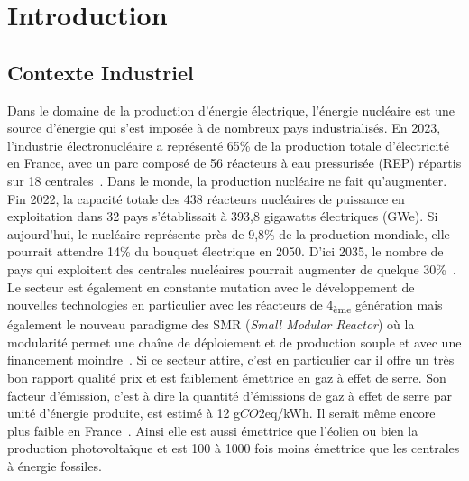 
\chapter{Introduction}

\section{Contexte Industriel}

Dans le domaine de la production d'énergie électrique, l'énergie nucléaire est une source d'énergie qui s'est imposée à de nombreux pays industrialisés. En 2023, l'industrie électronucléaire a représenté 65\% de la production totale d'électricité en France, avec un parc composé de 56 réacteurs à eau pressurisée (REP) répartis sur 18 centrales~\cite{rte2023}. Dans le monde, la production nucléaire ne fait qu'augmenter. Fin 2022, la capacité totale des 438 réacteurs nucléaires de puissance en exploitation dans 32 pays s’établissait à 393,8 gigawatts électriques (GWe). Si aujourd'hui, le nucléaire représente près de 9,8\% de la production mondiale, elle pourrait attendre 14\% du bouquet électrique en 2050. D'ici 2035, le nombre de pays qui exploitent des centrales nucléaires pourrait augmenter de quelque 30\%~\cite{aiea2023}. Le secteur est également en constante mutation avec le développement de nouvelles technologies en particulier avec les réacteurs de 4\textsubscript{ème} génération mais également le nouveau paradigme des SMR (\textit{Small Modular Reactor}) où la modularité permet une chaîne de déploiement et de production souple et avec une financement moindre~\cite{academie2022}. Si ce secteur attire, c'est en particulier car il offre un très bon rapport qualité prix et est faiblement émettrice en gaz à effet de serre. Son facteur d'émission, c'est à dire la quantité d'émissions de gaz à effet de serre par unité d'énergie produite, est estimé à 12 g$CO2$eq/kWh. Il serait même encore plus faible en France~\cite{schlomer_technology-specific_nodate}. Ainsi elle est aussi émettrice que l'éolien ou bien la production photovoltaïque et est 100 à 1000 fois moins émettrice que les centrales à énergie fossiles.

